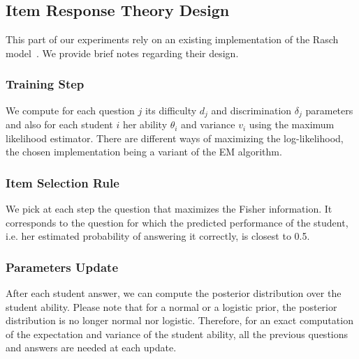 \documentclass{sig-alternate}
\begin{document}

\subsection{Item Response Theory Design}

This part of our experiments rely on an existing implementation of the Rasch model~\cite{MagisRaiche2012,Rizopoulos2006}. We provide brief notes regarding their design.

\subsubsection{Training Step}

We compute for each question $j$ its difficulty $d_j$ and discrimination $\delta_j$ parameters and also for each student $i$ her ability $\theta_i$ and variance $v_i$ using the maximum likelihood estimator. There are different ways of maximizing the log-likelihood, the chosen implementation being a variant of the EM algorithm. %

\subsubsection{Item Selection Rule}

We pick at each step the question that maximizes the Fisher information. It corresponds to the question for which the predicted performance of the student, i.e. her estimated probability of answering it correctly, is closest to 0.5. %

\subsubsection{Parameters Update}

After each student answer, we can compute the posterior distribution over the student ability. Please note that for a normal or a logistic prior, the posterior distribution is no longer normal nor logistic. Therefore, for an exact computation of the expectation and variance of the student ability, all the previous questions and answers are needed at each update.
\end{document}
